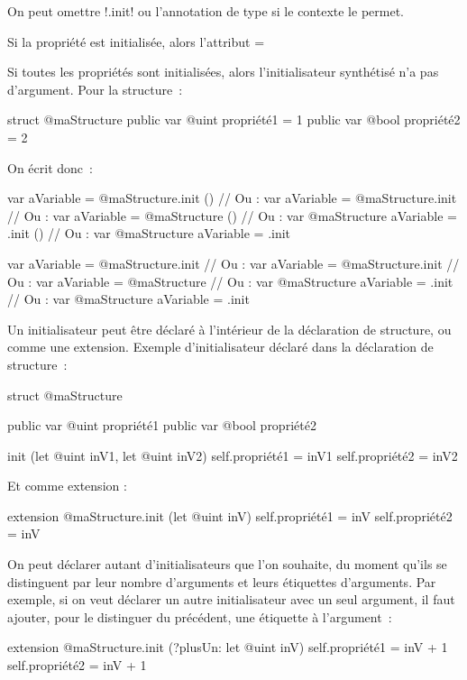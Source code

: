 On peut omettre \ggsq!.init! ou l'annotation de type si le contexte le permet.

Si la propriété est initialisée, alors l'attribut \ggsq=%


Si toutes les propriétés sont initialisées, alors l'initialisateur synthétisé n'a pas d'argument. Pour la structure~:
\begin{galgas34}
struct @maStructure {
  public var @uint propriété1 = 1
  public var @bool propriété2 = 2
}
\end{galgas34}

On écrit donc~:
\begin{galgas34}
var aVariable = @maStructure.init ()
// Ou :
var aVariable = @maStructure.init
// Ou :
var aVariable = @maStructure ()
// Ou :
var @maStructure aVariable = .init ()
// Ou :
var @maStructure aVariable = .init
\end{galgas34}
\begin{galgas3}
var aVariable = @maStructure.init {}
// Ou :
var aVariable = @maStructure.init
// Ou :
var aVariable = @maStructure {}
// Ou :
var @maStructure aVariable = .init {}
// Ou :
var @maStructure aVariable = .init
\end{galgas3}








Un initialisateur peut être déclaré à l'intérieur de la déclaration de structure, ou comme une extension. Exemple d'initialisateur déclaré dans la déclaration de structure~:

\begin{galgas34}
struct @maStructure {
  public var @uint propriété1
  public var @bool propriété2
  
  init (let @uint inV1, let @uint inV2) {
    self.propriété1 = inV1
    self.propriété2 = inV2
  }
}
\end{galgas34}

Et comme extension :

\begin{galgas34}
extension @maStructure.init (let @uint inV) {
  self.propriété1 = inV
  self.propriété2 = inV
}
\end{galgas34}

On peut déclarer autant d'initialisateurs que l'on souhaite, du moment qu'ils se distinguent par leur nombre d'arguments et leurs étiquettes d'arguments. Par exemple, si on veut déclarer un autre initialisateur avec un seul argument, il faut ajouter, pour le distinguer du précédent, une étiquette à l'argument~:
\begin{galgas34}
extension @maStructure.init (?plusUn: let @uint inV) {
  self.propriété1 = inV + 1
  self.propriété2 = inV + 1
}
\end{galgas34}

